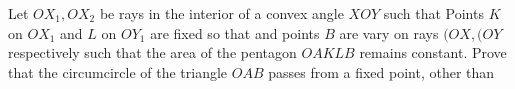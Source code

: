 Let  $OX_1 , OX_2$  be  rays in  the interior of a  convex  angle $XOY$ such that  Points  $K$  on $OX_1$  and  $L$  on  $OY_1$  are fixed so that   and  points  $B$  are  vary on rays $(OX , (OY$  respectively  such that  the area  of the pentagon  $OAKLB$  remains  constant. Prove that  the  circumcircle of the  triangle $OAB$  passes  from a  fixed  point,  other than  